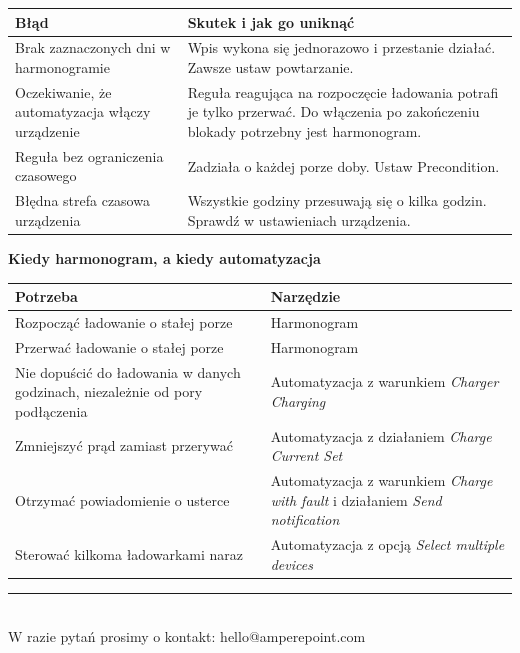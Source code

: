 \documentclass[11pt]{article}
\begin{document}
\vspace{0.2cm}
\begin{tabularx}{\textwidth}{@{}p{5.0cm}X@{}}
\toprule
\textbf{\color{apnavy}Błąd} & \textbf{\color{apnavy}Skutek i jak go uniknąć}\\
\midrule
Brak zaznaczonych dni w harmonogramie & Wpis wykona się jednorazowo i przestanie działać. Zawsze ustaw powtarzanie.\\
Oczekiwanie, że automatyzacja włączy urządzenie & Reguła reagująca na rozpoczęcie ładowania potrafi je tylko przerwać. Do włączenia po zakończeniu blokady potrzebny jest harmonogram.\\
Reguła bez ograniczenia czasowego & Zadziała o każdej porze doby. Ustaw Precondition.\\
Błędna strefa czasowa urządzenia & Wszystkie godziny przesuwają się o kilka godzin. Sprawdź w ustawieniach urządzenia.\\
\bottomrule
\end{tabularx}

\vspace{0.4cm}
{\bfseries\color{apnavy}\large Kiedy harmonogram, a kiedy automatyzacja}

\vspace{0.2cm}
\begin{tabularx}{\textwidth}{@{}p{6.6cm}X@{}}
\toprule
\textbf{\color{apnavy}Potrzeba} & \textbf{\color{apnavy}Narzędzie}\\
\midrule
Rozpocząć ładowanie o stałej porze & Harmonogram\\
Przerwać ładowanie o stałej porze & Harmonogram\\
Nie dopuścić do ładowania w danych godzinach, niezależnie od pory podłączenia & Automatyzacja z warunkiem \emph{Charger Charging}\\
Zmniejszyć prąd zamiast przerywać & Automatyzacja z działaniem \emph{Charge Current Set}\\
Otrzymać powiadomienie o usterce & Automatyzacja z warunkiem \emph{Charge with fault} i działaniem \emph{Send notification}\\
Sterować kilkoma ładowarkami naraz & Automatyzacja z opcją \emph{Select multiple devices}\\
\bottomrule
\end{tabularx}



\vspace{0.5cm}
{\color{apline}\rule{\textwidth}{0.8pt}}\\[0.15cm]
{\footnotesize\color{apmuted} W razie pytań prosimy o kontakt: hello@amperepoint.com}
\end{document}
